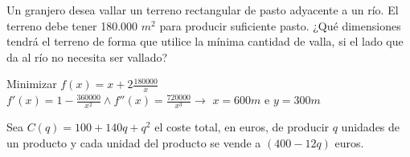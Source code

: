 \documentclass[addpoints,spanish, 12pt,a4paper]{exam}
\begin{document}
\begin{questions}
       
       

\question[4] Un granjero desea vallar un terreno rectangular de pasto adyacente a un río. El terreno debe tener 180.000
$m^2$
para producir suficiente pasto. ¿Qué dimensiones tendrá el terreno de
forma que utilice la mínima cantidad de valla, si el lado que da al río no necesita ser vallado?
\begin{solution}
    Minimizar $f(x)=x +2 \frac{180000}{x}$ \\
    $f'(x)= 1 - \frac{360000}{x^{2}} \land f''(x)=\frac{720000}{x^{3}} \to $
    $x=600 m$ e $y=300 m$
\end{solution}

\question Sea $C(q) = 100 + 140 q + q^2$ el coste total, en euros, de producir $q$ unidades de un
producto y cada unidad del producto se vende a $(400 - 12 q)$ euros.
\end{questions}
\end{document}
